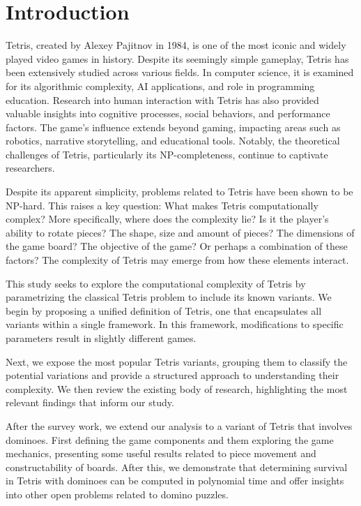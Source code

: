 \chapter{Introduction}

Tetris, created by Alexey Pajitnov in 1984, is one of the most iconic and widely played video games in history. Despite its seemingly simple gameplay, Tetris has been extensively studied across various fields\cite{TWRP}. In computer science, it is examined for its algorithmic complexity, AI applications, and role in programming education. Research into human interaction with Tetris has also provided valuable insights into cognitive processes, social behaviors, and performance factors. The game's influence extends beyond gaming, impacting areas such as robotics, narrative storytelling, and educational tools. Notably, the theoretical challenges of Tetris, particularly its NP-completeness, continue to captivate researchers.

Despite its apparent simplicity, problems related to Tetris have been shown to be NP-hard\cite{TIH}. This raises a key question: What makes Tetris computationally complex? More specifically, where does the complexity lie? Is it the player's ability to rotate pieces? The shape, size and amount of pieces? The dimensions of the game board? The objective of the game? Or perhaps a combination of these factors? The complexity of Tetris may emerge from how these elements interact.

This study seeks to explore the computational complexity of Tetris by parametrizing the classical Tetris problem to include its known variants. We begin by proposing a unified definition of Tetris, one that encapsulates all variants within a single framework. In this framework, modifications to specific parameters result in slightly different games.

Next, we expose the most popular Tetris variants, grouping them to classify the potential variations and provide a structured approach to understanding their complexity. We then review the existing body of research, highlighting the most relevant findings that inform our study.

After the survey work, we extend our analysis to a variant of Tetris that involves dominoes. First defining the game components and them exploring the game mechanics, presenting some useful results related to piece movement and constructability of boards. After this, we demonstrate that determining survival in Tetris with dominoes can be computed in polynomial time and offer insights into other open problems related to domino puzzles.
